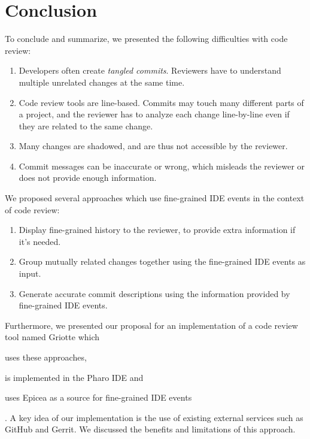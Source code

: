 \documentclass[conference,a4paper]{IEEEtran}
\begin{document}
\section{Conclusion}
\label{sec:conclusion}

To conclude and summarize, we presented the following difficulties
with code review:
\begin{enumerate}[label=(\arabic*)]
\item Developers often create \textit{tangled commits}. Reviewers have
  to understand multiple unrelated changes at the same time.
\item Code review tools are line-based. Commits may touch many
  different parts of a project, and the reviewer has to analyze each
  change line-by-line even if they are related to the same change.
\item Many changes are shadowed, and are thus not accessible by the
  reviewer.
\item Commit messages can be inaccurate or wrong, which misleads the
  reviewer or does not provide enough information.
\end{enumerate}

We proposed several approaches which use fine-grained IDE events in
the context of code review:
\begin{enumerate}[label=(\arabic*)]
\item Display fine-grained history to the reviewer, to provide extra
  information if it's needed.
\item Group mutually related changes together using the fine-grained
  IDE events as input.
\item Generate accurate commit descriptions using the information
  provided by fine-grained IDE events.
\end{enumerate}

Furthermore, we presented our proposal for an implementation of a code
review tool named Griotte which \begin{enumerate*}[label=(\arabic*)]
\item uses these approaches, \item is implemented in the Pharo
  IDE and \item uses Epicea as a source for fine-grained IDE
  events \end{enumerate*}. A key idea of our implementation is the use
of existing external services such as GitHub and Gerrit. We discussed
the benefits and limitations of this approach.

\newpage



\end{document}
